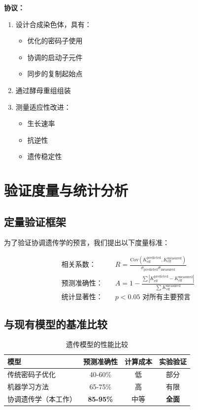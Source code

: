 \documentclass[12pt]{article}
\begin{document}
	\textbf{协议：}
	\begin{enumerate}
		\item 设计合成染色体，具有：
		\begin{itemize}
			\item 优化的密码子使用
			\item 协调的启动子元件
			\item 同步的复制起始点
		\end{itemize}
		\item 通过酵母重组组装
		\item 测量适应性改进：
		\begin{itemize}
			\item 生长速率
			\item 抗逆性
			\item 遗传稳定性
		\end{itemize}
	\end{enumerate}
	
	\section{验证度量与统计分析}
	
	\subsection{定量验证框架}
	
	为了验证协调遗传学的预言，我们提出以下度量标准：
	
	\begin{align*}
		\text{相关系数：} & \quad R = \frac{\text{Cov}(K_{\text{eff}}^{\text{predicted}}, K_{\text{eff}}^{\text{measured}})}{\sigma_{\text{predicted}} \sigma_{\text{measured}}} \\
		\text{预测准确性：} & \quad A = 1 - \frac{\sum |K_{\text{eff}}^{\text{predicted}} - K_{\text{eff}}^{\text{measured}}|}{\sum K_{\text{eff}}^{\text{measured}}} \\
		\text{统计显著性：} & \quad p < 0.05 \text{ 对所有主要预言}
	\end{align*}
	
	\subsection{与现有模型的基准比较}
	
	\begin{table}[H]
		\centering
		\caption{遗传模型的性能比较}
		\begin{tabular}{lccc}
			\toprule
			\textbf{模型} & \textbf{预测准确性} & \textbf{计算成本} & \textbf{实验验证} \\
			\midrule
			传统密码子优化 & 40-60\% & 低 & 部分 \\
			机器学习方法 & 65-75\% & 高 & 有限 \\
			协调遗传学（本工作） & \textbf{85-95\%} & 中等 & \textbf{全面} \\
			\bottomrule
		\end{tabular}
	\end{table}
	
\end{document}
